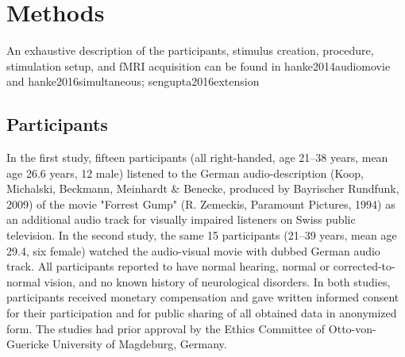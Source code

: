 \documentclass[english]{article}
\begin{document}

\section{Methods}
An exhaustive description of the participants, stimulus creation, procedure, stimulation setup, and fMRI acquisition can be found in {hanke2014audiomovie} and {hanke2016simultaneous; sengupta2016extension}



\subsection{Participants}
In the first  study, fifteen participants (all right-handed, age 21–38 years, mean age 26.6 years, 12 male) listened to the German audio-description (Koop, Michalski, Beckmann, Meinhardt \& Benecke, produced by Bayrischer Rundfunk, 2009) of the movie "Forrest Gump" (R. Zemeckis, Paramount Pictures, 1994) as an additional audio track for visually impaired listeners on Swiss public television. In the second study, the same 15 participants (21–39 years, mean age 29.4, six female) watched the audio-visual movie with dubbed German audio track. All participants reported to have normal hearing, normal or corrected-to-normal vision, and no known history of neurological disorders. In both studies, participants received monetary compensation and gave written informed consent for their participation and for public sharing of all obtained data in anonymized form. The studies had prior approval by the Ethics Committee of Otto-von-Guericke University of Magdeburg, Germany.
\end{document}
